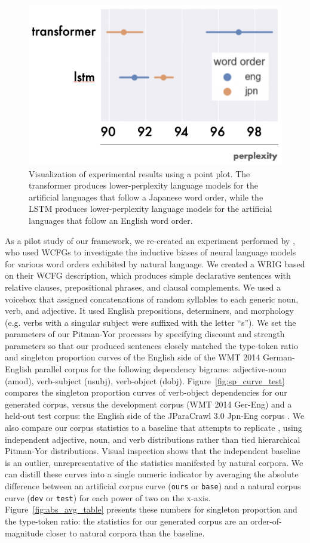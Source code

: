 \documentclass[11pt]{article}
\begin{document}
\begin{figure}[t]
\centering
\includegraphics[width=.48\textwidth]{images/boxplot.png}
\caption{Visualization of experimental results using a point plot. The transformer produces lower-perplexity language models for the artificial languages that follow a Japanese word order, while the LSTM produces lower-perplexity language models for the artificial languages that follow an English word order.}
\label{fig:results}
\end{figure}


As a pilot study of our framework, we re-created an experiment performed by \citet{white-cotterell-2021-examining}, who used WCFGs to investigate the inductive biases of neural language models for various word orders exhibited by natural language. We created a WRIG based on their WCFG description, which produces simple declarative sentences with relative clauses, prepositional phrases, and clausal complements. We used a voicebox that assigned concatenations of random syllables to each generic noun, verb, and adjective. It used English prepositions, determiners, and morphology (e.g. verbs with a singular subject were suffixed with the letter ``s''). We set the parameters of our Pitman-Yor processes by specifying discount and strength parameters so that our produced sentences closely matched the type-token ratio and singleton proportion curves of the English side of the WMT 2014 German-English parallel corpus \cite{bojar-etal-2014-findings,luong-etal-2015-effective} for the following dependency bigrams: adjective-noun (amod), verb-subject (nsubj), verb-object (dobj). Figure~\ref{fig:sp_curve_test} compares the singleton proportion curves of verb-object dependencies for our generated corpus, versus the development corpus (WMT 2014 Ger-Eng) and a held-out test corpus: the English side of the JParaCrawl 3.0 Jpn-Eng corpus \cite{morishita2022jparacrawl}. We also compare our corpus statistics to a baseline that attempts to replicate \cite{white-cotterell-2021-examining}, using independent adjective, noun, and verb distributions rather than tied hierarchical Pitman-Yor distributions. Visual inspection shows that the independent baseline is an outlier, unrepresentative of the statistics manifested by natural corpora. We can distill these curves into a single numeric indicator by averaging the absolute difference between an artificial corpus curve (\texttt{ours} or \texttt{base}) and a natural corpus curve (\texttt{dev} or \texttt{test}) for each power of two on the x-axis. Figure~\ref{fig:abs_avg_table} presents these numbers for singleton proportion and the type-token ratio: the statistics for our generated corpus are an order-of-magnitude closer to natural corpora than the baseline.
\end{document}
